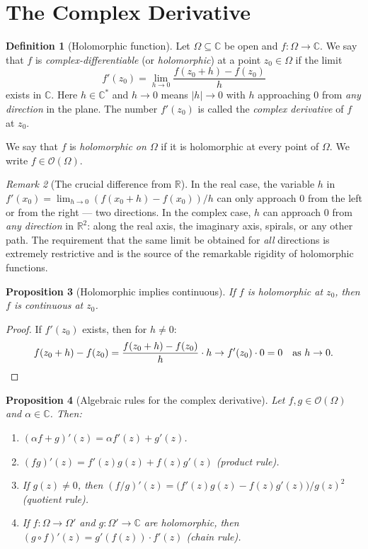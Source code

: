 \documentclass[12pt,a4paper,openany]{book}
\theoremstyle{definition}
\newtheorem{definition}{Definition}[chapter]
\theoremstyle{plain}
\newtheorem{proposition}[definition]{Proposition}
\theoremstyle{remark}
\newtheorem{remark}[definition]{Remark}
\newcommand{\C}{\mathbb{C}}
\newcommand{\R}{\mathbb{R}}
\newcommand{\abs}[1]{\left|#1\right|}
\begin{document}
\section{The Complex Derivative}
\label{sec:complex-derivative}

\begin{definition}[Holomorphic function]
\label{def:holomorphic}
Let $\Omega\subseteq\C$ be open and $f:\Omega\to\C$. We say that $f$ is \emph{complex-differentiable} (or \emph{holomorphic}) at a point $z_0\in\Omega$ if the limit
\[
  f'(z_0) = \lim_{h\to 0}\frac{f(z_0+h)-f(z_0)}{h}
\]
exists in $\C$. Here $h\in\C^*$ and $h\to 0$ means $\abs{h}\to 0$ with $h$ approaching $0$ from \emph{any direction} in the plane. The number $f'(z_0)$ is called the \emph{complex derivative} of $f$ at $z_0$.

We say that $f$ is \emph{holomorphic on $\Omega$} if it is holomorphic at every point of $\Omega$. We write $f\in\mathscr{O}(\Omega)$.
\end{definition}

\begin{remark}[The crucial difference from $\R$]
\label{rem:crucial-difference}
In the real case, the variable $h$ in $f'(x_0) = \lim_{h\to 0}(f(x_0+h)-f(x_0))/h$ can only approach $0$ from the left or from the right --- two directions. In the complex case, $h$ can approach $0$ from \emph{any direction} in $\R^2$: along the real axis, the imaginary axis, spirals, or any other path. The requirement that the same limit be obtained for \emph{all} directions is extremely restrictive and is the source of the remarkable rigidity of holomorphic functions.
\end{remark}

\begin{proposition}[Holomorphic implies continuous]
\label{prop:holo-continuous}
If $f$ is holomorphic at $z_0$, then $f$ is continuous at $z_0$.
\end{proposition}

\begin{proof}
If $f'(z_0)$ exists, then for $h\neq 0$:
\[
  f(z_0+h) - f(z_0) = \frac{f(z_0+h)-f(z_0)}{h}\cdot h \to f'(z_0)\cdot 0 = 0 \quad\text{as } h\to 0. \qedhere
\]
\end{proof}

\begin{proposition}[Algebraic rules for the complex derivative]
\label{prop:derivative-rules}
Let $f,g\in\mathscr{O}(\Omega)$ and $\alpha\in\C$. Then:
\begin{enumerate}[label=\textup{(\roman*)}]
  \item $(\alpha f+g)'(z) = \alpha f'(z)+g'(z)$.
  \item $(fg)'(z) = f'(z)g(z)+f(z)g'(z)$ \textup{(product rule)}.
  \item If $g(z)\neq 0$, then $(f/g)'(z) = \bigl(f'(z)g(z)-f(z)g'(z)\bigr)/g(z)^2$ \textup{(quotient rule)}.
  \item If $f:\Omega\to\Omega'$ and $g:\Omega'\to\C$ are holomorphic, then $(g\circ f)'(z) = g'(f(z))\cdot f'(z)$ \textup{(chain rule)}.
\end{enumerate}
\end{proposition}
\end{document}
